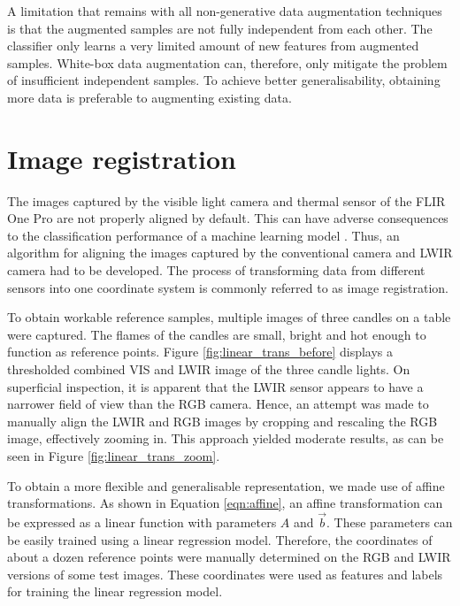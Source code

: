 \documentclass{l4proj}
\begin{document}
A limitation that remains with all non-generative data augmentation techniques is that the augmented samples are not fully independent from each other. The classifier only learns a very limited amount of new features from augmented samples. White-box data augmentation can, therefore, only mitigate the problem of insufficient independent samples. To achieve better generalisability, obtaining more data is preferable to augmenting existing data.


\section{Image registration}
\label{image_registration}

The images captured by the visible light camera and thermal sensor of the FLIR One Pro are not properly aligned by default. This can have adverse consequences to the classification performance of a machine learning model \citep{chappelow_improving_2008}. Thus, an algorithm for aligning the images captured by the conventional camera and LWIR camera had to be developed. The process of transforming data from different sensors into one coordinate system is commonly referred to as image registration.

To obtain workable reference samples, multiple images of three candles on a table were captured. The flames of the candles are small, bright and hot enough to function as reference points. Figure \ref{fig:linear_trans_before} displays a thresholded combined VIS and LWIR image of the three candle lights. On superficial inspection, it is apparent that the LWIR sensor appears to have a narrower field of view than the RGB camera. Hence, an attempt was made to manually align the LWIR and RGB images by cropping and rescaling the RGB image, effectively zooming in. This approach yielded moderate results, as can be seen in Figure \ref{fig:linear_trans_zoom}.

To obtain a more flexible and generalisable representation, we made use of affine transformations. As shown in Equation \ref{eqn:affine}, an affine transformation can be expressed as a linear function with parameters $A$ and $\vec{b}$. These parameters can be easily trained using a linear regression model. Therefore, the coordinates of about a dozen reference points were manually determined on the RGB and LWIR versions of some test images. These coordinates were used as features and labels for training the linear regression model. 
\end{document}
